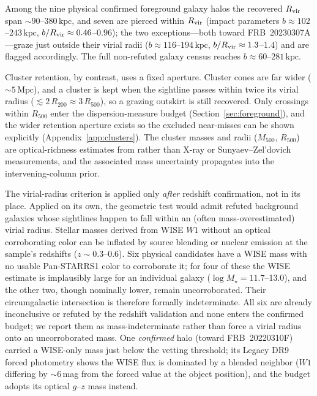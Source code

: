 Among the nine physical confirmed foreground galaxy halos
the recovered $R_{\rm vir}$ span $\sim\!90$--$380\,\mathrm{kpc}$, and seven
are pierced within $R_{\rm vir}$ (impact parameters
$b\approx102$--$243\,\mathrm{kpc}$, $b/R_{\rm vir}\approx0.46$--$0.96$); the two
exceptions---both toward FRB~20230307A---graze just outside their virial radii
($b\approx116$--$194\,\mathrm{kpc}$, $b/R_{\rm vir}\approx1.3$--$1.4$) and are
flagged accordingly. The full
non-refuted galaxy census reaches $b\approx60$--$281\,\mathrm{kpc}$.

Cluster retention, by contrast, uses a fixed aperture. Cluster cones are far
wider ($\sim\!5\,\mathrm{Mpc}$), and a cluster is kept when the sightline passes
within twice its virial radius ($\lesssim2\,R_{200}\approx3\,R_{500}$), so a
grazing outskirt is still recovered. Only crossings within $R_{500}$ enter the
dispersion-measure budget (Section~\ref{sec:foreground}), and the wider
retention aperture exists so the excluded near-misses can be shown explicitly
(Appendix~\ref{app:clusters}). The cluster masses and radii ($M_{500}$,
$R_{500}$) are optical-richness estimates from \citet{WenHan2024} rather than
X-ray or Sunyaev--Zel'dovich measurements, and the associated mass uncertainty
propagates into the intervening-column prior.

The virial-radius criterion is applied only \emph{after} redshift confirmation,
not in its place. Applied on its own, the geometric test would admit refuted
background galaxies whose sightlines happen to fall within an (often
mass-overestimated) virial radius. Stellar masses derived from WISE $W1$ without an optical
corroborating color can be inflated by source blending or nuclear emission at
the sample's redshifts ($z\sim0.3$--0.6). Six physical candidates have a WISE mass with
no usable Pan-STARRS1 color to corroborate it; for four of these the WISE
estimate is implausibly large for an individual galaxy
($\log M_\star=11.7$--13.0), and the other two, though nominally lower, remain
uncorroborated. Their circumgalactic intersection is therefore formally
indeterminate. All six are already inconclusive or refuted by the redshift
validation and none enters the confirmed budget; we report them as
mass-indeterminate rather than force a virial radius onto an uncorroborated mass.
One \emph{confirmed} halo (toward FRB~20220310F) carried a WISE-only mass just
below the vetting threshold; its Legacy DR9 forced photometry shows the WISE
flux is dominated by a blended neighbor ($W1$ differing by $\sim$6\,mag from
the forced value at the object position), and the budget adopts its optical
$g$--$z$ \citep[][]{Zibetti2009} mass instead.


